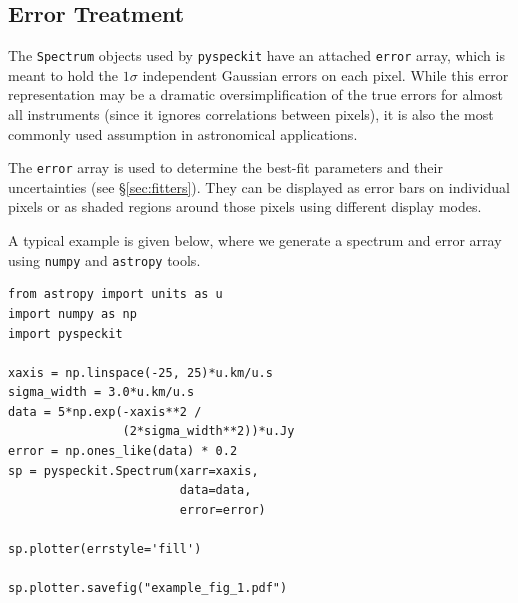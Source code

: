 \documentclass[twocolumn]{aastex62}
\newcommand{\pyspeckit}{\texttt{pyspeckit}\xspace}
\begin{document}
\subsection{Error Treatment}



The \texttt{Spectrum} objects used by \pyspeckit have an attached \texttt{error}
array, which is meant to hold the $1\sigma$ independent Gaussian errors on
each pixel.  While this error representation may be a dramatic
oversimplification of the true errors for almost all instruments (since it
ignores correlations between pixels), it is also the most
commonly used assumption in astronomical applications.

The \texttt{error} array is used to determine the best-fit parameters and their uncertainties (see
\S \ref{sec:fitters}).  They can be displayed as error bars on individual
pixels or as shaded regions around those pixels using different display modes.

A typical example is given below, where we generate a spectrum and error
array using \texttt{numpy} and \texttt{astropy} tools.

\vspace{2mm}
\begin{minipage}{\linewidth}
\begin{verbatim}
from astropy import units as u
import numpy as np
import pyspeckit

xaxis = np.linspace(-25, 25)*u.km/u.s
sigma_width = 3.0*u.km/u.s
data = 5*np.exp(-xaxis**2 /
                (2*sigma_width**2))*u.Jy
error = np.ones_like(data) * 0.2
sp = pyspeckit.Spectrum(xarr=xaxis,
                        data=data,
                        error=error)

sp.plotter(errstyle='fill')

sp.plotter.savefig("example_fig_1.pdf")
\end{verbatim}
\end{minipage}
\end{document}
